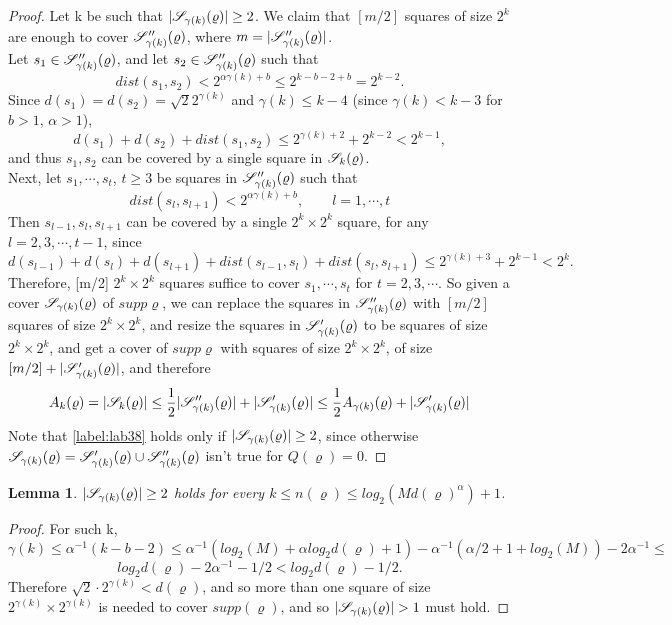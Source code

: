 \documentclass[11pt,reqno]{article}
\DeclarePairedDelimiter\abs{\lvert}{\rvert}%
\newtheorem{lemma}[thm]{Lemma}
\theoremstyle{definition}
\numberwithin{equation}{section}
\begin{document}
\begin{proof}
Let k be such that $\abs{\SqrsSetGamma} \geq 2$. We claim that $[m/2]$ squares of size $2^k$ are enough to cover $\mathscr{S}^{\prime\prime}_{\gamma(k)}(\varrho)$, where $m=\abs{\SqrsSetDtagGamma}$.\\
Let $s_1 \in \mathscr{S}^{\prime\prime}_{\gamma(k)}(\varrho)$, and let $s_2 \in \mathscr{S}^{\prime\prime}_{\gamma(k)}(\varrho)$ such that $$dist(s_1, s_2) < 2^{\alpha \gamma(k) + b} \leq 2^{k-b-2 + b} = 2^{k-2}.$$
Since $d(s_1)=d(s_2)=\sqrt{2} 2^{\gamma(k)}$ and $\gamma(k) \leq k-4$ (since $\gamma(k) < k-3$ for $b>1$, $\alpha > 1$), 
$$d(s_1) + d(s_2) + dist(s_1, s_2) \leq 2^{\gamma(k) + 2} + 2^{k-2} < 2^{k-1},$$
and thus $s_1, s_2$ can be covered by a single square in $\mathscr{S}_k(\varrho)$.\\
Next, let $s_1, \cdots, s_t$, $t \geq 3$ be squares in $\mathscr{S}^{\prime\prime}_{\gamma(k)}(\varrho)$ such that
$$dist(s_l, s_{l+1}) < 2^{\alpha \gamma(k) + b}, \qquad l=1,\cdots,t$$
Then $s_{l-1}, s_l, s_{l+1}$ can be covered by a single $2^k\times2^k$ square, for any $l=2,3,\cdots,t-1$, since
$$d(s_{l-1}) + d(s_l) + d(s_{l+1}) + dist(s_{l-1}, s_l) + dist(s_l, s_{l+1}) \leq 2^{\gamma(k) + 3} + 2^{k-1} < 2^k.$$
Therefore, [m/2] $2^k\times2^k$ squares suffice to cover $s_1, \cdots, s_t$ for $t=2,3,\cdots$. So given a cover $\mathscr{S}_{\gamma(k)}(\varrho)$ of $supp\varrho$, we can replace the squares in $\mathscr{S}^{\prime\prime}_{\gamma(k)}(\varrho)$ with $[m/2]$ squares of size $2^k\times2^k$, and resize the squares in $\mathscr{S}^\prime_{\gamma(k)}(\varrho)$ to be squares of size $2^k\times2^k$, and get a cover of $supp\varrho$ with squares of size $2^k\times2^k$, of size $[m/2] + \abs{\SqrsSetTagGamma}$, and therefore
\begin{equation} \label{label:lab38}
A_k(\varrho) = \abs{\SqrsSet} \leq
\frac{1}{2}\abs{\SqrsSetDtagGamma} + \abs{\SqrsSetTagGamma} \leq
\frac{1}{2} A_{\gamma(k)}(\varrho) + \abs{\SqrsSetTagGamma}
\end{equation}
Note that \eqref{label:lab38} holds only if $\abs{\SqrsSetGamma} \geq 2$, since otherwise $\mathscr{S}_{\gamma(k)}(\varrho) = \mathscr{S}^\prime_{\gamma(k)}(\varrho) \cup \mathscr{S}^{\prime\prime}_{\gamma(k)}(\varrho)$ isn't true for $Q(\varrho)=0$.
\end{proof}

\begin{lemma} \label{lemma:GammaCond}
$\abs{\SqrsSetGamma} \geq 2$ holds for every $k \leq n(\varrho) \leq log_2(Md(\varrho)^\alpha) + 1$.
\end{lemma}
\begin{proof}
For such k, 
$$\gamma(k) \leq \alpha^{-1}(k-b-2) \leq
\alpha^{-1}(log_2(M) + \alpha log_2d(\varrho) + 1) - \alpha^{-1}(\alpha/2 + 1 + log_2(M)) - 2\alpha^{-1} \leq $$
$$log_2d(\varrho) - 2\alpha^{-1} - 1/2 < 
log_2d(\varrho)-1/2.$$
Therefore $\sqrt{2}\cdot2^{\gamma(k)} < d(\varrho)$, and so more than one square of size $2^{\gamma(k)}\times2^{\gamma(k)}$ is needed to cover $supp(\varrho)$, and so $\abs{\SqrsSetGamma} > 1$ must hold.
\end{proof}
\end{document}
